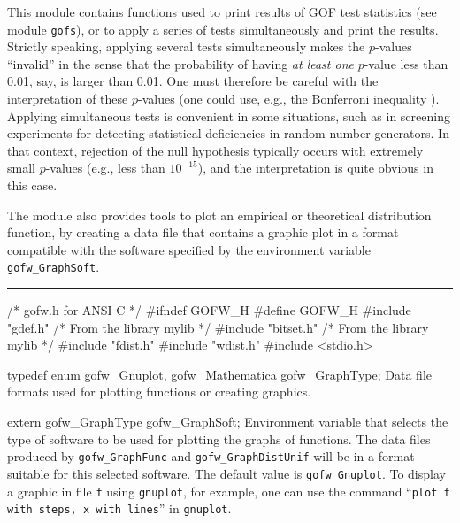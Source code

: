 
This module contains functions used to print results of GOF
test statistics (see module {\tt gofs}), or to apply a series of tests
simultaneously and print the results.
Strictly speaking, applying several tests simultaneously makes the
$p$-values ``invalid'' in the sense that the probability of having
{\em at least one\/} $p$-value less than 0.01, say, is larger than 0.01.
One must therefore be careful with the interpretation of these
$p$-values (one could use, e.g., the Bonferroni inequality \cite{sLAW00a}).
Applying simultaneous tests is convenient in some situations, such as in
screening experiments for detecting statistical deficiencies
in random number generators.  In that context, rejection of the null
hypothesis typically occurs with extremely small $p$-values (e.g., less
than $10^{-15}$), and the interpretation is quite obvious in this case.


The module also provides tools to plot an empirical or
theoretical distribution function, by creating a data file that
contains a graphic plot in a format compatible with the software
specified by the environment variable {\tt gofw\_GraphSoft}.


\bigskip\hrule\medskip
\code\hide
/* gofw.h for ANSI C */
#ifndef GOFW_H
#define GOFW_H
\endhide
#include "gdef.h"           /* From the library mylib */
#include "bitset.h"         /* From the library mylib */
#include "fdist.h"
#include "wdist.h"
#include <stdio.h>
\endcode


\code

typedef enum {
   gofw_Gnuplot,
   gofw_Mathematica
   } gofw_GraphType;
\endcode
 \tab  Data file formats used for plotting functions or creating graphics.
 \endtab
\code


extern gofw_GraphType gofw_GraphSoft;
\endcode
 \tab Environment variable that selects the type of software to be
   used for plotting the graphs of functions.
   The data files produced by {\tt gofw\_GraphFunc} and
   {\tt gofw\_GraphDistUnif} will be in a format suitable
   for this selected software.
   The default value is {\tt gofw\_Gnuplot}.
   To display a graphic in file {\tt f} using {\tt gnuplot}, for example,
   one can use the command ``{\tt plot f with steps, x with lines}''
   in {\tt gnuplot}.
 \endtab
\code


